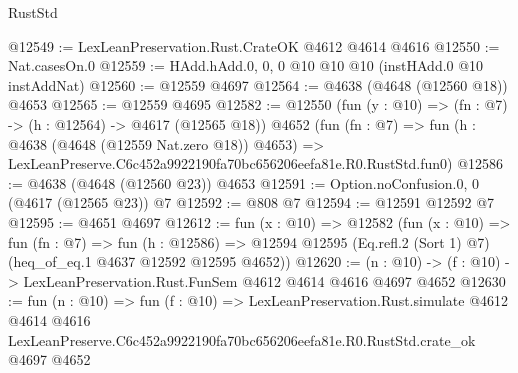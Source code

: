 \begin{lexlean}{RustStd}
\begin{coremodule}
@12549 := LexLeanPreservation.Rust.CrateOK @4612 @4614 @4616
@12550 := Nat.casesOn.{0}
@12559 := HAdd.hAdd.{0, 0, 0} @10 @10 @10 (instHAdd.{0} @10 instAddNat)
@12560 := @12559 @4697
@12564 := @4638 (@4648 (@12560 @18)) @4653
@12565 := @12559 @4695
@12582 := @12550
    (fun (y : @10) => (fn : @7) -> (h : @12564) -> @4617 (@12565 @18))
    @4652
    (fun (fn : @7) =>
    fun (h : @4638 (@4648 (@12559 Nat.zero @18)) @4653) =>
    LexLeanPreserve.C6c452a9922190fa70bc656206eefa81e.R0.RustStd.fun0)
@12586 := @4638 (@4648 (@12560 @23)) @4653
@12591 := Option.noConfusion.{0, 0} (@4617 (@12565 @23)) @7
@12592 := @808 @7
@12594 := @12591 @12592 @7
@12595 := @4651 @4697
@12612 := fun (x : @10) =>
  @12582
    (fun (x : @10) =>
    fun (fn : @7) =>
    fun (h : @12586) =>
    @12594 @12595 (Eq.refl.{2} (Sort 1) @7) (heq_of_eq.{1} @4637 @12592 @12595 @4652))
@12620 := (n : @10) -> (f : @10) -> LexLeanPreservation.Rust.FunSem @4612 @4614 @4616 @4697 @4652
@12630 := fun (n : @10) =>
  fun (f : @10) =>
  LexLeanPreservation.Rust.simulate
    @4612
    @4614
    @4616
    LexLeanPreserve.C6c452a9922190fa70bc656206eefa81e.R0.RustStd.crate_ok
    @4697
    @4652
\end{coremodule}
\end{lexlean}
